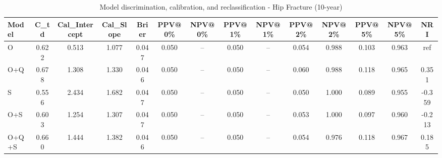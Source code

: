 \begin{table}[htbp]
\centering
\small
\caption{Model discrimination, calibration, and reclassification - Hip Fracture (10-year)}
\label{tab:perf_pd_10y}
\begin{tabular}{lccccccccccccc}
\toprule
Model & C\_td & Cal\_Intercept & Cal\_Slope & Brier & PPV@0\% & NPV@0\% & PPV@1\% & NPV@1\% & PPV@2\% & NPV@2\% & PPV@5\% & NPV@5\% & NRI \\
\midrule
O & 0.622 & 0.513 & 1.077 & 0.047 & 0.050 & -- & 0.050 & -- & 0.054 & 0.988 & 0.103 & 0.963 & ref \\
O+Q & 0.678 & 1.308 & 1.330 & 0.046 & 0.050 & -- & 0.050 & -- & 0.060 & 0.988 & 0.118 & 0.965 & 0.351 \\
S & 0.556 & 2.434 & 1.682 & 0.047 & 0.050 & -- & 0.050 & -- & 0.050 & 1.000 & 0.089 & 0.955 & -0.359 \\
O+S & 0.603 & 1.254 & 1.307 & 0.047 & 0.050 & -- & 0.050 & -- & 0.053 & 1.000 & 0.097 & 0.960 & -0.213 \\
O+Q+S & 0.660 & 1.444 & 1.382 & 0.046 & 0.050 & -- & 0.050 & -- & 0.054 & 0.976 & 0.118 & 0.967 & 0.185 \\
\bottomrule
\end{tabular}
\end{table}